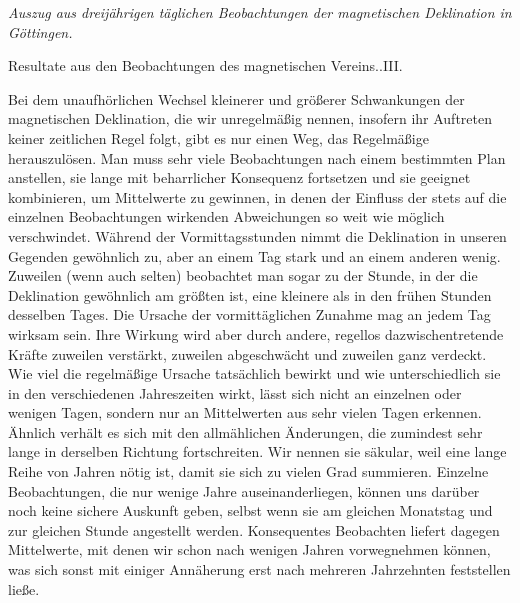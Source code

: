 \begin{center}\large\textit{Auszug aus dreijährigen täglichen Beobachtungen der magnetischen Deklination in Göttingen.}\end{center}
\begin{center}\small Resultate aus den Beobachtungen des magnetischen Vereins..\quad III.\end{center}

Bei dem unaufhörlichen Wechsel kleinerer und größerer Schwankungen der magnetischen Deklination, die wir unregelmäßig nennen, insofern ihr Auftreten keiner zeitlichen Regel folgt, gibt es nur einen Weg, das Regelmäßige herauszulösen. Man muss sehr viele Beobachtungen nach einem bestimmten Plan anstellen, sie lange mit beharrlicher Konsequenz fortsetzen und sie geeignet kombinieren, um Mittelwerte zu gewinnen, in denen der Einfluss der stets auf die einzelnen Beobachtungen wirkenden Abweichungen so weit wie möglich verschwindet. Während der Vormittagsstunden nimmt die Deklination in unseren Gegenden gewöhnlich zu, aber an einem Tag stark und an einem anderen wenig. Zuweilen (wenn auch selten) beobachtet man sogar zu der Stunde, in der die Deklination gewöhnlich am größten ist, eine kleinere als in den frühen Stunden desselben Tages. Die Ursache der vormittäglichen Zunahme mag an jedem Tag wirksam sein. Ihre Wirkung wird aber durch andere, regellos dazwischentretende Kräfte zuweilen verstärkt, zuweilen abgeschwächt und zuweilen ganz verdeckt. Wie viel die regelmäßige Ursache tatsächlich bewirkt und wie unterschiedlich sie in den verschiedenen Jahreszeiten wirkt, lässt sich nicht an einzelnen oder wenigen Tagen, sondern nur an Mittelwerten aus sehr vielen Tagen
erkennen. Ähnlich verhält es sich mit den allmählichen Änderungen, die zumindest sehr lange in derselben Richtung fortschreiten. Wir nennen sie säkular, weil eine lange Reihe von Jahren nötig ist, damit sie sich zu vielen Grad summieren. Einzelne Beobachtungen, die nur wenige Jahre auseinanderliegen, können uns darüber noch keine sichere Auskunft geben, selbst wenn sie am gleichen Monatstag und zur gleichen Stunde angestellt werden. Konsequentes Beobachten liefert dagegen Mittelwerte, mit denen wir schon nach wenigen Jahren vorwegnehmen können, was sich sonst mit einiger Annäherung erst nach mehreren Jahrzehnten feststellen ließe.


